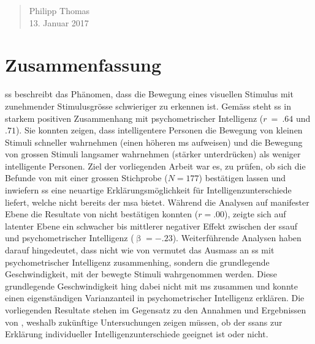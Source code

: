 \documentclass[11pt, twoside, a4paper]{book}		%
\begin{document}
\vspace{5 mm}

\begin{quote}
Philipp Thomas\\
13. Januar 2017
\end{quote}


\chapter*{Zusammenfassung \label{cha:Zusammenfassung}}

\gls{ss} beschreibt das Phänomen, dass die Bewegung eines visuellen Stimulus mit zunehmender Stimulusgrösse schwieriger zu erkennen ist.
Gemäss \citet{Melnick2013} steht \gls{ss} in starkem positiven Zusammenhang mit psychometrischer Intelligenz ($r~=~.64$ und $.71$). Sie konnten zeigen, dass intelligentere Personen die Bewegung von kleinen Stimuli schneller wahrnehmen (einen höheren \gls{ms} aufweisen) und die Bewegung von grossen Stimuli langsamer wahrnehmen (stärker unterdrücken) als weniger intelligente Personen.
Ziel der vorliegenden Arbeit war es, zu prüfen, ob sich die Befunde von \citeauthor{Melnick2013} mit einer grossen Stichprobe ($N=177$) bestätigen lassen und inwiefern \gls{ss} eine neuartige Erklärungsmöglichkeit für Intelligenzunterschiede liefert, welche nicht bereits der \gls{msa} bietet.
Während die Analysen auf manifester Ebene die Resultate von \citeauthor{Melnick2013} nicht bestätigen konnten ($r=.00$), zeigte sich auf latenter Ebene ein schwacher bis mittlerer negativer Effekt zwischen der \gls{ssauf} und psychometrischer Intelligenz ($\upbeta=-.23$). 
Weiterführende Analysen haben darauf hingedeutet, dass nicht wie von \citeauthor{Melnick2013} vermutet das Ausmass an \gls{ss} mit psychometrischer Intelligenz zusammenhing, sondern die grundlegende Geschwindigkeit, mit der bewegte Stimuli wahrgenommen werden. 
Diese grundlegende Geschwindigkeit hing dabei nicht mit \gls{ms} zusammen und konnte einen eigenständigen Varianzanteil in psychometrischer Intelligenz erklären.
Die vorliegenden Resultate stehen im Gegensatz zu den Annahmen und Ergebnissen von \citeauthor{Melnick2013}, weshalb
zukünftige Untersuchungen zeigen müssen, ob der \gls{ssans} zur Erklärung individueller Intelligenzunterschiede geeignet ist oder nicht.


\begingroup%
\hypersetup{linkcolor=black}					%
\renewcommand{\contentsname}{Inhalte}			%
\setcounter{tocdepth}{3}						%
\tableofcontents								%
\endgroup
\end{document}
